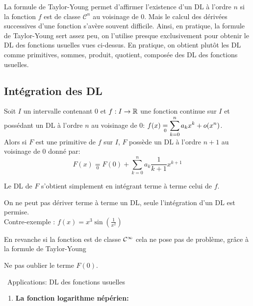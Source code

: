 \documentclass[a4paper, 11pt]{article}
\begin{document}
{\begin{rem}
\noindent La formule de Taylor-Young permet d'affirmer l'existence d'un DL \`a l'ordre $n$ si la fonction $f$ est de classe $\mathcal{C}^n$ au voisinage de 0. Mais le calcul des d\'eriv\'ees successives d'une fonction s'av\`ere souvent difficile. Ainsi, en pratique, la formule de Taylor-Young sert assez peu, on l'utilise presque exclusivement pour obtenir le DL des fonctions usuelles vues ci-dessus. En pratique, on obtient plut\^ot les DL comme primitives, sommes, produit, quotient, compos\'ee des DL des fonctions usuelles.
\end{rem}

\subsection{Int\'egration des DL}



 {\noindent  

\begin{prop} 
\noindent Soit $I$ un intervalle contenant 0 et $f: I\rightarrow \mathbb{R}$ une fonction continue sur $I$ et poss\'edant un DL \`a l'ordre $n$ au voisinage de 0: $f(x)\underset{0}{=}\displaystyle\sum\limits_{k=0}^n a_kx^k+o(x^n)$.\\%
\noindent Alors si $F$ est une primitive de $f$ sur $I$, $F$ poss\`ede un DL \`a l'ordre $n+1$ au voisinage de 0 donn\'e par:\vsec\\
$$F(x)\underset{0}{=} F(0) + \sum_{k=0}^n a_k \frac{1}{k+1}
x^{k+1}$$

Le DL de $F$ s'obtient simplement en int\'egrant terme \`a terme celui de $f$.
\end{prop}
 
}
\vspace{0.3cm}

\warning  On ne peut pas d\'eriver terme \`a terme un DL, seule l'int\'egration d'un DL est permise.\\
Contre-exemple : $f(x) =x^3\sin(\frac{1}{x^2})$

En revanche si la fonction est de classe $\mathcal{C}^\infty$ cela ne pose pas de problème, grâce à la formule de Taylor-Young


 \warning  Ne pas oublier le terme $F(0)$.


\noindent\ {Applications: DL des fonctions usuelles}\\
\begin{enumerate}
\item \textbf{\large{La fonction logarithme n\'ep\'erien:}}\vsec


\end{enumerate}}
\end{document}
